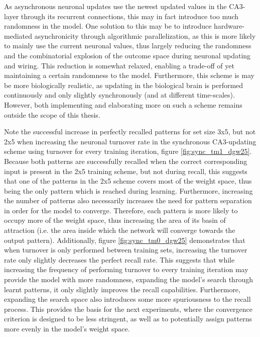 As asynchronous neuronal updates use the newest updated values in the CA3-layer through its recurrent connections, this may in fact introduce too much randomness in the model. One solution to this may be to introduce hardware-mediated asynchronicity through algorithmic parallelization, as this is more likely to mainly use the current neuronal values, thus largely reducing the randomness and the combinatorial explosion of the outcome space during neuronal updating and wiring. This reduction is somewhat relaxed, enabling a trade-off of yet maintaining a certain randomness to the model. Furthermore, this scheme is may be more biologically realistic, as updating in the biological brain is performed continuously and only slightly synchronously (and at different time-scales). However, both implementing and elaborating more on such a scheme remains outside the scope of this thesis.

Note the successful increase in perfectly recalled patterns for set size 3x5, but not 2x5 when increasing the neuronal turnover rate in the synchronous CA3-updating scheme using turnover for every training iteration, figure \ref{fig:sync_tm1_dgw25}. Because both patterns are successfully recalled when the correct corresponding input is present in the 2x5 training scheme, but not during recall, this suggests that one of the patterns in the 2x5 scheme covers most of the weight space, thus being the only pattern which is reached during learning. Furthermore, increasing the number of patterns also necessarily increases the need for pattern separation in order for the model to converge. Therefore, each pattern is more likely to occupy more of the weight space, thus increasing the area of its basin of attraction (i.e. the area inside which the network will converge towards the output pattern). Additionally, figure \ref{fig:sync_tm0_dgw25} demonstrates that when turnover is only performed between training sets, increasing the turnover rate only slightly decreases the perfect recall rate. This suggests that while increasing the frequency of performing turnover to every training iteration may provide the model with more randomness, expanding the model's search through learnt patterns, it only slightly improves the recall capabilities. Furthermore, expanding the search space also introduces some more spuriousness to the recall process. This provides the basis for the next experiments, where the convergence criterion is designed to be less stringent, as well as to potentially assign patterns more evenly in the model's weight space.

